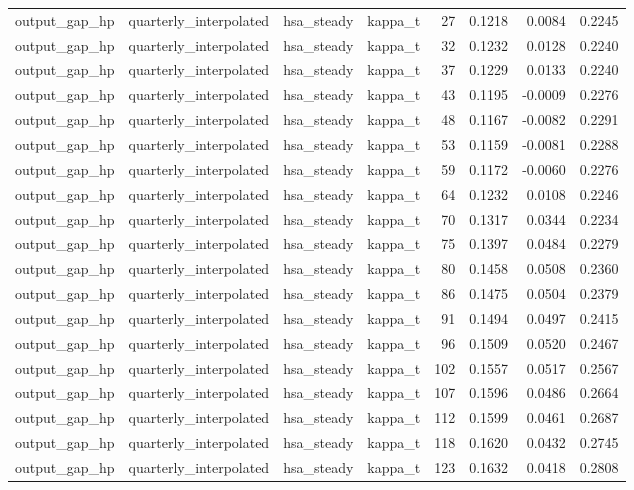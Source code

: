\begin{tabular}{llllrrrr}
output\_gap\_hp & quarterly\_interpolated & hsa\_steady & kappa\_t & 27 & 0.1218 & 0.0084 & 0.2245 \\
output\_gap\_hp & quarterly\_interpolated & hsa\_steady & kappa\_t & 32 & 0.1232 & 0.0128 & 0.2240 \\
output\_gap\_hp & quarterly\_interpolated & hsa\_steady & kappa\_t & 37 & 0.1229 & 0.0133 & 0.2240 \\
output\_gap\_hp & quarterly\_interpolated & hsa\_steady & kappa\_t & 43 & 0.1195 & -0.0009 & 0.2276 \\
output\_gap\_hp & quarterly\_interpolated & hsa\_steady & kappa\_t & 48 & 0.1167 & -0.0082 & 0.2291 \\
output\_gap\_hp & quarterly\_interpolated & hsa\_steady & kappa\_t & 53 & 0.1159 & -0.0081 & 0.2288 \\
output\_gap\_hp & quarterly\_interpolated & hsa\_steady & kappa\_t & 59 & 0.1172 & -0.0060 & 0.2276 \\
output\_gap\_hp & quarterly\_interpolated & hsa\_steady & kappa\_t & 64 & 0.1232 & 0.0108 & 0.2246 \\
output\_gap\_hp & quarterly\_interpolated & hsa\_steady & kappa\_t & 70 & 0.1317 & 0.0344 & 0.2234 \\
output\_gap\_hp & quarterly\_interpolated & hsa\_steady & kappa\_t & 75 & 0.1397 & 0.0484 & 0.2279 \\
output\_gap\_hp & quarterly\_interpolated & hsa\_steady & kappa\_t & 80 & 0.1458 & 0.0508 & 0.2360 \\
output\_gap\_hp & quarterly\_interpolated & hsa\_steady & kappa\_t & 86 & 0.1475 & 0.0504 & 0.2379 \\
output\_gap\_hp & quarterly\_interpolated & hsa\_steady & kappa\_t & 91 & 0.1494 & 0.0497 & 0.2415 \\
output\_gap\_hp & quarterly\_interpolated & hsa\_steady & kappa\_t & 96 & 0.1509 & 0.0520 & 0.2467 \\
output\_gap\_hp & quarterly\_interpolated & hsa\_steady & kappa\_t & 102 & 0.1557 & 0.0517 & 0.2567 \\
output\_gap\_hp & quarterly\_interpolated & hsa\_steady & kappa\_t & 107 & 0.1596 & 0.0486 & 0.2664 \\
output\_gap\_hp & quarterly\_interpolated & hsa\_steady & kappa\_t & 112 & 0.1599 & 0.0461 & 0.2687 \\
output\_gap\_hp & quarterly\_interpolated & hsa\_steady & kappa\_t & 118 & 0.1620 & 0.0432 & 0.2745 \\
output\_gap\_hp & quarterly\_interpolated & hsa\_steady & kappa\_t & 123 & 0.1632 & 0.0418 & 0.2808 \\

\end{tabular}
